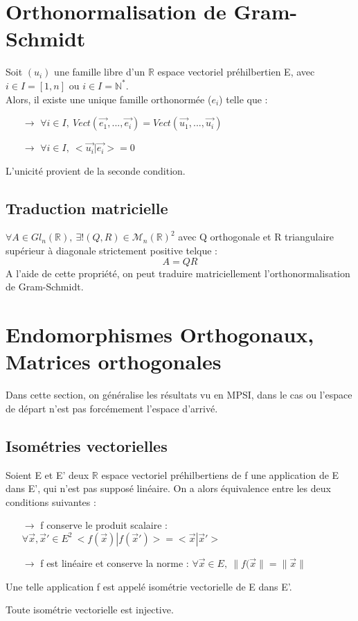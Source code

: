 \section{Orthonormalisation de Gram-Schmidt}
\begin{theo}
Soit $(u_i)$ une famille libre d'un $\mathbb{R}$ espace vectoriel préhilbertien E, avec $i \in I = [1,n]$ ou $i \in I = \mathbb{N}^*$.\\
Alors, il existe une unique famille orthonormée ($e_i$) telle que : 
\begin{itemize}
 \item[$\rightarrow$] $\forall i \in I,~ Vect(\overrightarrow{e_1},...,\overrightarrow{e_i}) = Vect(\overrightarrow{u_1},...,\overrightarrow{u_i})$
 \item[$\rightarrow$] $\forall i \in I,~ <\overrightarrow{u_i}|\overrightarrow{e_i}> = 0$
\end{itemize}
L'unicité provient de la seconde condition.
\end{theo}
\subsection{Traduction matricielle}
\begin{prop}
$\forall A \in Gl_n(\mathbb{R}),~ \exists!(Q,R) \in \mathcal{M}_n(\mathbb{R})^2$ avec Q orthogonale et R triangulaire supérieur à diagonale strictement positive telque : 
$$A = QR$$
A l'aide de cette propriété, on peut traduire matriciellement l'orthonormalisation de Gram-Schmidt.
\end{prop}
\section{Endomorphismes Orthogonaux, Matrices orthogonales}
Dans cette section, on généralise les résultats vu en MPSI, dans le cas ou l'espace de départ n'est pas forcémement l'espace d'arrivé.
\subsection{Isométries vectorielles}
\begin{prop}
Soient E et E' deux $\mathbb{R}$ espace vectoriel préhilbertiens de f une application de E dans E', qui n'est pas supposé linéaire. On a alors équivalence entre les deux conditions suivantes : 
\begin{itemize}
 \item[$\rightarrow$] f conserve le produit scalaire : $\forall \overrightarrow{x},\overrightarrow{x}' \in E^2~ <f(\overrightarrow{x})|f(\overrightarrow{x}')> = <\overrightarrow{x}|\overrightarrow{x}'>$
 \item[$\rightarrow$] f est linéaire et conserve la norme : $\forall \overrightarrow{x} \in E,~ \parallel f(\overrightarrow{x}\parallel = \parallel\overrightarrow{x}\parallel$
\end{itemize}
\end{prop}
\begin{de}
Une telle application f est appelé isométrie vectorielle de E dans E'.
\end{de}
\begin{prop}
Toute isométrie vectorielle est injective.
\end{prop}
